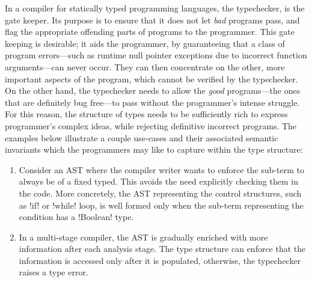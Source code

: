 \documentclass[screen,nonacm,manuscript,review]{acmart} %
\begin{document}
In a compiler for statically typed programming languages, the
typechecker, is the gate keeper. Its purpose is to ensure that it does
not let \emph{bad} programs pass, and flag the appropriate offending
parts of programs to the programmer. This gate keeping is desirable;
it aids the programmer, by guaranteeing that a class of program
errors---such as runtime null pointer exceptions due to incorrect
function arguments---can never occur. They can then concentrate on the
other, more important aspects of the program, which cannot be verified
by the typechecker. On the other hand, the typechecker needs to allow
the \emph{good} programs---the ones that are definitely bug free---to
pass without the programmer's intense struggle. For
this reason, the structure of types needs to be sufficiently rich
to express programmer's complex ideas, while rejecting definitive incorrect
programs. The examples below illustrate a couple use-cases and
their associated semantic invariants which the programmers may like to
capture within the type structure:
\begin{enumerate}
\item Consider an AST where the compiler writer wants to enforce the
  sub-term to always be of a fixed typed. This avoids the need
  explicitly checking them in the code.
  More concretely, the AST representing the control structures, such
  as !if! or !while! loop, is well formed only when the sub-term
  representing the condition has a !Boolean! type.
\item In a multi-stage compiler, the AST is gradually enriched with
  more information after each analysis stage. The type structure can
  enforce that the information is accessed only after it is populated,
  otherwise, the typechecker raises a type
  error\cite{peyton_jones_trees_2017}.
\end{enumerate}
\end{document}
